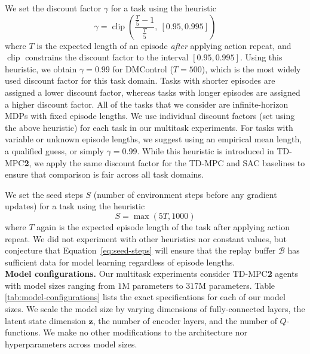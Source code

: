 \documentclass{article}
\begin{document}
We set the discount factor $\gamma$ for a task using the heuristic
\begin{equation}
    \gamma = \operatorname{clip}(\frac{\frac{T}{5} - 1}{\frac{T}{5}},~[0.95, 0.995])
\end{equation}
where $T$ is the expected length of an episode \emph{after} applying action repeat, and $\operatorname{clip}$ constrains the discount factor to the interval $[0.95, 0.995]$. Using this heuristic, we obtain $\gamma = 0.99$ for DMControl ($T=500$), which is the most widely used discount factor for this task domain. Tasks with shorter episodes are assigned a lower discount factor, whereas tasks with longer episodes are assigned a higher discount factor. All of the tasks that we consider are infinite-horizon MDPs with fixed episode lengths. We use individual discount factors (set using the above heuristic) for each task in our multitask experiments. For tasks with variable or unknown episode lengths, we suggest using an empirical mean length, a qualified guess, or simply $\gamma=0.99$. While this heuristic is introduced in TD-MPC\textbf{2}, we apply the same discount factor for the TD-MPC and SAC baselines to ensure that comparison is fair across all task domains.

We set the seed steps $S$ (number of environment steps before any gradient updates) for a task using the heuristic
\begin{equation}
    \label{eq:seed-steps}
    S = \max(5T, 1000)
\end{equation}
where $T$ again is the expected episode length of the task after applying action repeat. We did not experiment with other heuristics nor constant values, but conjecture that Equation~\ref{eq:seed-steps} will ensure that the replay buffer $\mathcal{B}$ has sufficient data for model learning regardless of episode lengths.\\

\textbf{Model configurations.} Our multitask experiments consider TD-MPC\textbf{2} agents with model sizes ranging from $1$M parameters to $317$M parameters. Table \ref{tab:model-configurations} lists the exact specifications for each of our model sizes. We scale the model size by varying dimensions of fully-connected layers, the latent state dimension $\mathbf{z}$, the number of encoder layers, and the number of $Q$-functions. We make no other modifications to the architecture nor hyperparameters across model sizes.
\end{document}
